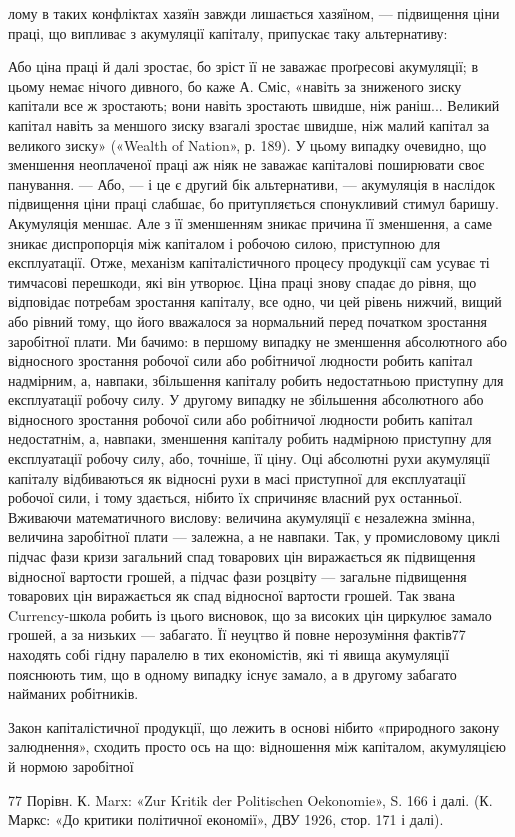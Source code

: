 лому в таких конфліктах хазяїн завжди лишається хазяїном, —
підвищення ціни праці, що випливає з акумуляції капіталу,
припускає таку альтернативу:

Або ціна праці й далі зростає, бо зріст її не заважає проґресові
акумуляції; в цьому немає нічого дивного, бо каже А. Сміс,
«навіть за зниженого зиску капітали все ж зростають; вони навіть
зростають швидше, ніж раніш... Великий капітал навіть
за меншого зиску взагалі зростає швидше, ніж малий капітал за
великого зиску» («Wealth of Nation», р. 189). У цьому випадку
очевидно, що зменшення неоплаченої праці аж ніяк не заважає
капіталові поширювати своє панування. — Або, — і це є другий
бік альтернативи, — акумуляція в наслідок підвищення ціни
праці слабшає, бо притупляється спонукливий стимул баришу.
Акумуляція меншає. Але з її зменшенням зникає причина її
зменшення, а саме зникає диспропорція між капіталом і робочою
силою, приступною для експлуатації. Отже, механізм капіталістичного
процесу продукції сам усуває ті тимчасові перешкоди,
які він утворює. Ціна праці знову спадає до рівня, що
відповідає потребам зростання капіталу, все одно, чи цей рівень
нижчий, вищий або рівний тому, що його вважалося за нормальний
перед початком зростання заробітної плати. Ми бачимо:
в першому випадку не зменшення абсолютного або відносного
зростання робочої сили або робітничої людности робить капітал
надмірним, а, навпаки, збільшення капіталу робить недостатньою
приступну для експлуатації робочу силу. У другому випадку
не збільшення абсолютного або відносного зростання робочої
сили або робітничої людности робить капітал недостатнім, а,
навпаки, зменшення капіталу робить надмірною приступну для
експлуатації робочу силу, або, точніше, її ціну. Оці абсолютні
рухи акумуляції капіталу відбиваються як відносні рухи в масі
приступної для експлуатації робочої сили, і тому здається, нібито
їх спричиняє власний рух останньої. Вживаючи математичного
вислову: величина акумуляції є незалежна змінна, величина
заробітної плати — залежна, а не навпаки. Так, у промисловому
циклі підчас фази кризи загальний спад товарових цін виражається
як підвищення відносної вартости грошей, а підчас фази
розцвіту — загальне підвищення товарових цін виражається як
спад відносної вартости грошей. Так звана Currency-школа
робить із цього висновок, що за високих цін циркулює замало
грошей, а за низьких — забагато. Її неуцтво й повне нерозуміння
фактів77 находять собі гідну паралелю в тих економістів,
які ті явища акумуляції пояснюють тим, що в одному випадку
існує замало, а в другому забагато найманих робітників.

Закон капіталістичної продукції, що лежить в основі нібито
«природного закону залюднення», сходить просто ось на що:
відношення між капіталом, акумуляцією й нормою заробітної

77 Порівн. К. Marx: «Zur Kritik der Politischen Oekonomie»,
S. 166 і далі. (К. Маркс: «До критики політичної економії», ДВУ 1926,
стор. 171 і далі).
